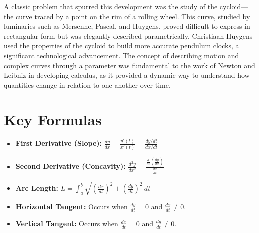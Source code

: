 \documentclass{article}
\begin{document}
A classic problem that spurred this development was the study of the cycloid—the curve traced by a point on the rim of a rolling wheel. This curve, studied by luminaries such as Mersenne, Pascal, and Huygens, proved difficult to express in rectangular form but was elegantly described parametrically. Christiaan Huygens used the properties of the cycloid to build more accurate pendulum clocks, a significant technological advancement. The concept of describing motion and complex curves through a parameter was fundamental to the work of Newton and Leibniz in developing calculus, as it provided a dynamic way to understand how quantities change in relation to one another over time.

\section{Key Formulas}
\begin{itemize}
    \item \textbf{First Derivative (Slope):} $\displaystyle \frac{dy}{dx} = \frac{y'(t)}{x'(t)} = \frac{dy/dt}{dx/dt}$
    \item \textbf{Second Derivative (Concavity):} $\displaystyle \frac{d^2y}{dx^2} = \frac{\frac{d}{dt}\left(\frac{dy}{dx}\right)}{\frac{dx}{dt}}$
    \item \textbf{Arc Length:} $\displaystyle L = \int_{a}^{b} \sqrt{\left(\frac{dx}{dt}\right)^2 + \left(\frac{dy}{dt}\right)^2} \, dt$
    \item \textbf{Horizontal Tangent:} Occurs when $\frac{dy}{dt} = 0$ and $\frac{dx}{dt} \neq 0$.
    \item \textbf{Vertical Tangent:} Occurs when $\frac{dx}{dt} = 0$ and $\frac{dy}{dt} \neq 0$.
\end{itemize}
\end{document}
